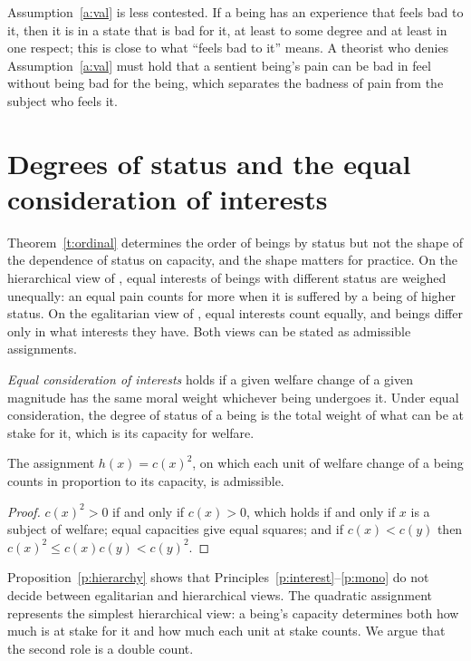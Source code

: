 \documentclass{situationist-preprint}
\begin{document}
Assumption~\ref{a:val} is less contested. If a being has an experience that feels bad to it, then it is in a state that is bad for it, at least to some degree and at least in one respect; this is close to what \enquote{feels bad to it} means. A theorist who denies Assumption~\ref{a:val} must hold that a sentient being's pain can be bad in feel without being bad for the being, which separates the badness of pain from the subject who feels it.

\section{Degrees of status and the equal consideration of interests}\label{s:degrees}

Theorem~\ref{t:ordinal} determines the order of beings by status but not the shape of the dependence of status on capacity, and the shape matters for practice. On the hierarchical view of \citet{Kagan2019}, equal interests of beings with different status are weighed unequally: an equal pain counts for more when it is suffered by a being of higher status. On the egalitarian view of \citet{Singer1975}, equal interests count equally, and beings differ only in what interests they have. Both views can be stated as admissible assignments.

\begin{definition}\label{d:ec}
\emph{Equal consideration of interests} holds if a given welfare change of a given magnitude has the same moral weight whichever being undergoes it. Under equal consideration, the degree of status of a being is the total weight of what can be at stake for it, which is its capacity for welfare.
\end{definition}

\begin{proposition}\label{p:hierarchy}
The assignment $h(x) = c(x)^2$, on which each unit of welfare change of a being counts in proportion to its capacity, is admissible.
\end{proposition}

\begin{proof}
$c(x)^2 > 0$ if and only if $c(x) > 0$, which holds if and only if $x$ is a subject of welfare; equal capacities give equal squares; and if $c(x) < c(y)$ then $c(x)^2 \le c(x)c(y) < c(y)^2$.
\end{proof}

Proposition~\ref{p:hierarchy} shows that Principles~\ref{p:interest}--\ref{p:mono} do not decide between egalitarian and hierarchical views. The quadratic assignment represents the simplest hierarchical view: a being's capacity determines both how much is at stake for it and how much each unit at stake counts. We argue that the second role is a double count.
\end{document}
